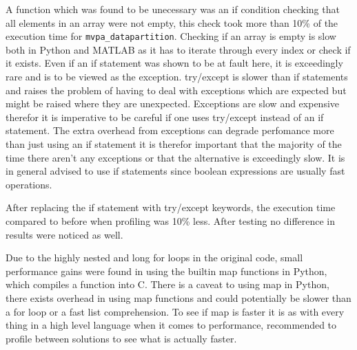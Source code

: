 \documentclass[12pt, a4paper]{article}
\begin{document}
A function which was found to be unecessary was an if condition checking that all elements in an array were not empty, this check took more than 10\% of the execution time for \texttt{mvpa\_datapartition}.
Checking if an array is empty is slow both in Python and MATLAB as it has to iterate through every index or check if it exists.
Even if an if statement was shown to be at fault here, it is exceedingly rare and is to be viewed as the exception.
try/except is slower than if statements and raises the problem of having to deal with exceptions which are expected but might be raised where they are unexpected.
Exceptions are slow and expensive therefor it is imperative to be careful if one uses try/except instead of an if statement.
The extra overhead from exceptions can degrade perfomance more than just using an if statement it is therefor important that the majority of the time there aren't any exceptions or that the alternative is exceedingly slow.
It is in general advised to use if statements since boolean expressions are usually fast operations.

After replacing the if statement with try/except keywords, the execution time compared to before when profiling was 10\% less.
After testing no difference in results were noticed as well.%

Due to the highly nested and long for loops in the original code, small performance gains were found in using the builtin map functions in Python, which compiles a function into C.
There is a caveat to using map in Python, there exists overhead in using map functions and could potentially be slower than a for loop or a fast list comprehension. 
To see if map is faster it is as with every thing in a high level language when it comes to performance, recommended to profile between solutions to see what is actually faster.

\end{document}
